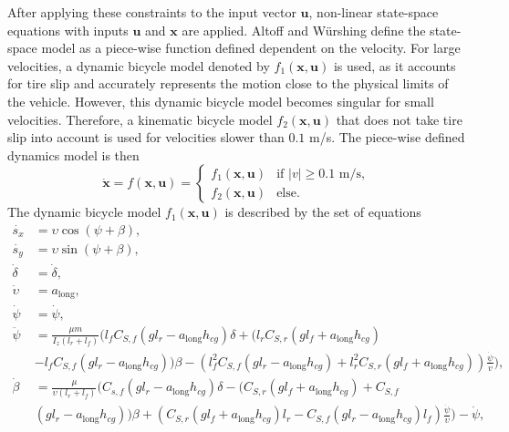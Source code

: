 After applying these constraints to the input vector $\mathbf{u}$, non-linear state-space equations with inputs $\mathbf{u}$ and $\mathbf{x}$ are applied.
Altoff and  W\"{u}rshing \cite{Althoff2020} define the state-space model as a piece-wise function defined dependent on the velocity. 
For large velocities, a dynamic bicycle model denoted by $f_1 (\mathbf{x}, \mathbf{u})$ is used, as it accounts for tire slip and accurately represents the motion close to the physical limits of the vehicle. 
However, this dynamic bicycle model becomes singular for small velocities. 
Therefore, a kinematic bicycle model $f_2 (\mathbf{x}, \mathbf{u})$ that does not take tire slip into account is used for velocities slower than $0.1$ m/s.
The piece-wise defined dynamics model is then
\begin{equation}
    \mathbf{\dot{x}} = f(\mathbf{x}, \mathbf{u}) = 
    \begin{cases}
    f_1 (\mathbf{x}, \mathbf{u}) & \text{if } |v| \geq 0.1 \text{ m/s}, \\
    f_2 (\mathbf{x}, \mathbf{u}) & \text{else.}
    \end{cases}
\label{eq:state_equation_cases}
\end{equation}
The dynamic bicycle model $f_1(\mathbf{x}, \mathbf{u})$ is described by the set of equations
\begin{equation}
\begin{split}
    \dot{s_x} &= \upsilon \cos(\psi + \beta), \\
    \dot{s_y} &= \upsilon \sin(\psi + \beta), \\
    \dot{\delta} &= \dot{\delta}, \\
    \dot{\upsilon} &= a_{\text{long}}, \\
    \dot{\psi} &= \dot{\psi}, \\
    \ddot{\psi} &= \frac{\mu m}{I_{z} (l_{r} + l_{f})}
    ( l_f C_{S,f} (g l_r - a_{\text{long}} h_{cg}) \delta + 
    (l_{r} C_{S,r} (g l_{f} + a_{\text{long}} h_{cg}) \\ &- 
    l_{f} C_{S,f} (g l_{r} - a_{\text{long}} h_{cg})) \beta -
    (l_{f}^{2} C_{S,f} (g l_{r} - a_{\text{long}} h_{cg}) +
    l_{r}^{2} C_{S,r} (g l_{f} + a_{\text{long}} h_{cg})) 
    \frac{\dot{\psi}}{v}), \\
    \dot{\beta} &= \frac{\mu}{\upsilon(l_r+l_f)} 
    ( C_{s,f}(g l_{r} - a_{\text{long}} h_{cg}) \delta - 
    (C_{S,r}(g l_f + a_{\text{long}} h_{cg}) + 
    C_{S,f} \\& (g l_r - a_{\text{long}} h_{cg})) \beta + 
    (C_{S,r} (g l_{f} + a_{\text{long}} h_{cg})l_{r} - 
    C_{S,f} (g l_{r} - a_{\text{long}} h_{cg}) l_{f}) 
    \frac{\dot{\psi}}{\upsilon} ) - \dot{\psi},
\label{eq:single_track_dynamic_equations}
\end{split}
\end{equation}
